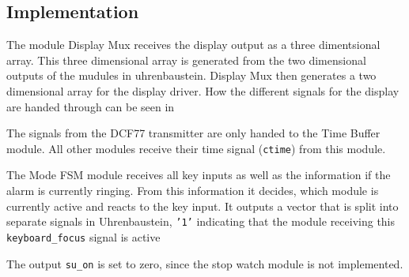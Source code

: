 \documentclass[a4paper]{article}
\begin{document}
\subsection{Implementation}

The module Display Mux receives the display output as a three dimentsional array.
This three dimensional array is generated from the two dimensional outputs of the mudules in uhrenbaustein.
Display Mux then generates a two dimensional array for the display driver.
How the different signals for the display are handed through can be seen in%

The signals from the DCF77 transmitter are only handed to the Time Buffer module. All other modules receive their time signal (\texttt{ctime}) from this module.

The Mode FSM module receives all key inputs as well as the information if the alarm is currently ringing. 
From this information it decides, which module is currently active and reacts to the key input. 
It outputs a vector that is split into separate signals in Uhrenbaustein, \texttt{'1'} indicating that the module receiving this \texttt{keyboard\_focus} signal is active%

The output \texttt{su\_on} is set to zero, since the stop watch module is not implemented.
\end{document}

